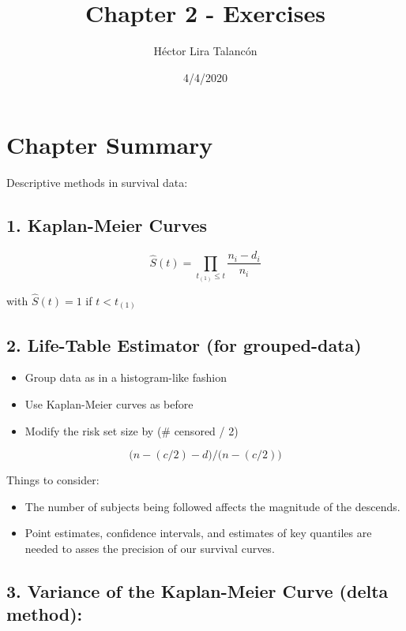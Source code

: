 \documentclass[]{article}
\title{Chapter 2 - Exercises}
\author{Héctor Lira Talancón}
\date{4/4/2020}
\providecommand{\tightlist}{%
  \setlength{\itemsep}{0pt}\setlength{\parskip}{0pt}}
\begin{document}
\maketitle

\hypertarget{chapter-summary}{%
\section{Chapter Summary}\label{chapter-summary}}

Descriptive methods in survival data:

\hypertarget{kaplan-meier-curves}{%
\subsection{1. Kaplan-Meier Curves}\label{kaplan-meier-curves}}

\[\hat{S}(t)=\prod\limits_{t_{(1)} \leq t} \frac{n_i - d_i}{n_i}\]

with \(\hat{S}(t)=1\) if \(t < t_{(1)}\)

\hypertarget{life-table-estimator-for-grouped-data}{%
\subsection{2. Life-Table Estimator (for
grouped-data)}\label{life-table-estimator-for-grouped-data}}

\begin{itemize}
\tightlist
\item
  Group data as in a histogram-like fashion
\item
  Use Kaplan-Meier curves as before
\item
  Modify the risk set size by (\# censored / 2)
\end{itemize}

\[\big(n - (c/2) - d\big) / \big(n - (c/2)\big)\]

Things to consider:

\begin{itemize}
\tightlist
\item
  The number of subjects being followed affects the magnitude of the
  descends.
\item
  Point estimates, confidence intervals, and estimates of key quantiles
  are needed to asses the precision of our survival curves.
\end{itemize}

\hypertarget{variance-of-the-kaplan-meier-curve-delta-method}{%
\subsection{3. Variance of the Kaplan-Meier Curve (delta
method):}\label{variance-of-the-kaplan-meier-curve-delta-method}}
\end{document}
